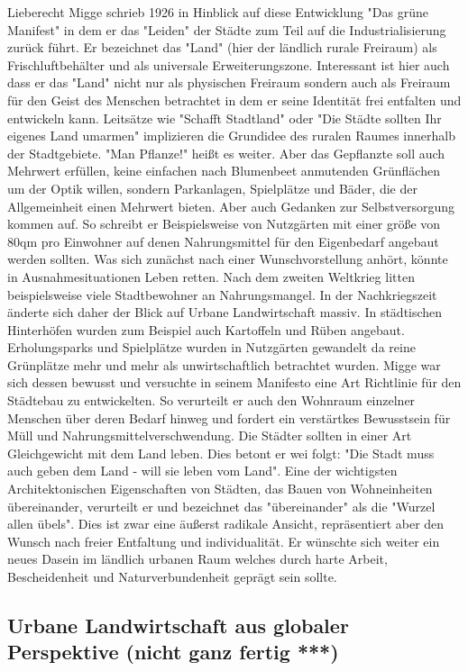 \documentclass{scrartcl}
\begin{document}
Lieberecht Migge schrieb 1926 in Hinblick auf diese Entwicklung "Das grüne Manifest" in dem er das "Leiden" der Städte zum Teil auf die Industrialisierung zurück führt. Er bezeichnet das "Land" (hier der ländlich rurale Freiraum) als Frischluftbehälter und als universale Erweiterungszone. Interessant ist hier auch dass er das "Land" nicht nur als physischen Freiraum sondern auch als Freiraum für den Geist des Menschen betrachtet in dem er seine Identität frei entfalten und entwickeln kann. Leitsätze wie "Schafft Stadtland" oder "Die Städte sollten Ihr eigenes Land umarmen" implizieren die Grundidee des ruralen Raumes innerhalb der Stadtgebiete. "Man Pflanze!" heißt es weiter. Aber das Gepflanzte soll auch Mehrwert erfüllen, keine einfachen nach Blumenbeet anmutenden Grünflächen um der Optik willen, sondern Parkanlagen, Spielplätze und Bäder, die der Allgemeinheit einen Mehrwert bieten. Aber auch Gedanken zur Selbstversorgung kommen auf. So schreibt er Beispielsweise von Nutzgärten mit einer größe von 80qm pro Einwohner auf denen Nahrungsmittel für den Eigenbedarf angebaut werden sollten. Was sich zunächst nach einer Wunschvorstellung anhört, könnte in Ausnahmesituationen Leben retten. Nach dem zweiten Weltkrieg litten beispielsweise viele Stadtbewohner an Nahrungsmangel. In der Nachkriegszeit änderte sich daher der Blick auf Urbane Landwirtschaft massiv. In städtischen Hinterhöfen wurden zum Beispiel auch Kartoffeln und Rüben angebaut. Erholungsparks und Spielplätze wurden in Nutzgärten gewandelt da reine Grünplätze mehr und mehr als unwirtschaftlich betrachtet wurden. Migge war sich dessen bewusst und versuchte in seinem Manifesto eine Art Richtlinie für den Städtebau zu entwickelten. So verurteilt er auch den Wohnraum einzelner Menschen über deren Bedarf hinweg und fordert ein verstärtkes Bewusstsein für Müll und Nahrungsmittelverschwendung. Die Städter sollten in einer Art Gleichgewicht mit dem Land leben. Dies betont er wei folgt: "Die Stadt muss auch geben dem Land - will sie leben vom Land". Eine der wichtigsten Architektonischen Eigenschaften von Städten, das Bauen von Wohneinheiten übereinander, verurteilt er und bezeichnet das "übereinander" als die "Wurzel allen übels". Dies ist zwar eine äußerst radikale Ansicht, repräsentiert aber den Wunsch nach freier Entfaltung und individualität. Er wünschte sich weiter ein neues Dasein im ländlich urbanen Raum welches durch harte Arbeit, Bescheidenheit und Naturverbundenheit geprägt sein sollte.

\subsection{Urbane Landwirtschaft aus globaler Perspektive (nicht ganz fertig ***)}
\end{document}
